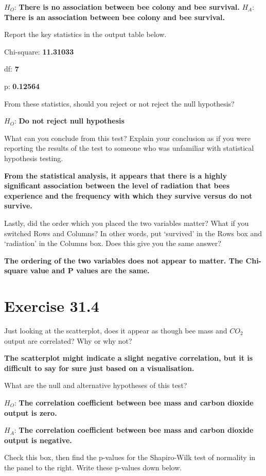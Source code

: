 \documentclass[
]{scrbook}
\begin{document}
\(H_{O}\): \textbf{There is no association between bee colony and bee survival.}
\(H_{A}\): \textbf{There is an association between bee colony and bee survival.}

Report the key statistics in the output table below.

Chi-square: \textbf{11.31033}

df: \textbf{7}

p: \textbf{0.12564}

From these statistics, should you reject or not reject the null hypothesis?

\(H_{O}\): \textbf{Do not reject null hypothesis}

What can you conclude from this test? Explain your conclusion as if you were reporting the results of the test to someone who was unfamiliar with statistical hypothesis testing.

\textbf{From the statistical analysis, it appears that there is a highly significant association between the level of radiation that bees experience and the frequency with which they survive versus do not survive.}

Lastly, did the order which you placed the two variables matter? What if you switched Rows and Columns? In other words, put `survived' in the Rows box and `radiation' in the Columns box. Does this give you the same answer?

\textbf{The ordering of the two variables does not appear to matter. The Chi-square value and P values are the same.}

\hypertarget{exercise-31.4}{%
\section{Exercise 31.4}\label{exercise-31.4}}

Just looking at the scatterplot, does it appear as though bee mass and \(CO_{2}\) output are correlated? Why or why not?

\textbf{The scatterplot might indicate a slight negative correlation, but it is difficult to say for sure just based on a visualisation.}

What are the null and alternative hypotheses of this test?

\(H_{O}\): \textbf{The correlation coefficient between bee mass and carbon dioxide output is zero.}

\(H_{A}\): \textbf{The correlation coefficient between bee mass and carbon dioxide output is negative.}

Check this box, then find the p-values for the Shapiro-Wilk test of normality in the panel to the right. Write these p-values down below.
\end{document}
